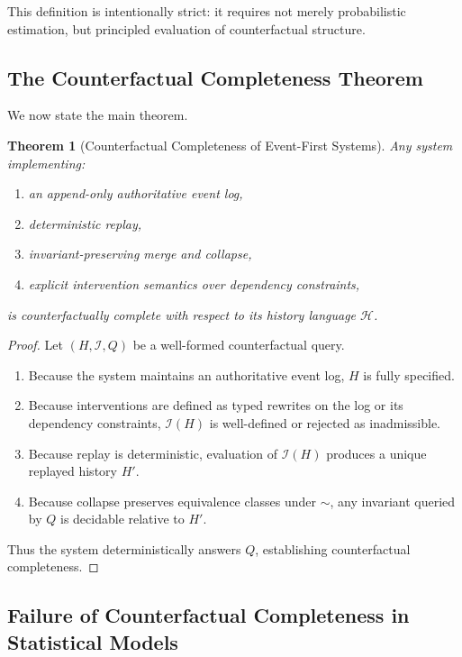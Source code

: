 \documentclass[11pt]{article}
\newtheorem{theorem}{Theorem}
\begin{document}
This definition is intentionally strict: it requires not merely probabilistic estimation, but principled evaluation of counterfactual structure.

\subsection{The Counterfactual Completeness Theorem}

We now state the main theorem.

\begin{theorem}[Counterfactual Completeness of Event-First Systems]
Any system implementing:
\begin{enumerate}
  \item an append-only authoritative event log,
  \item deterministic replay,
  \item invariant-preserving merge and collapse,
  \item explicit intervention semantics over dependency constraints,
\end{enumerate}
is counterfactually complete with respect to its history language $\mathcal{H}$.
\end{theorem}

\begin{proof}
Let $(H,\mathcal{I},Q)$ be a well-formed counterfactual query.
\begin{enumerate}
  \item Because the system maintains an authoritative event log, $H$ is fully specified.
  \item Because interventions are defined as typed rewrites on the log or its dependency constraints, $\mathcal{I}(H)$ is well-defined or rejected as inadmissible.
  \item Because replay is deterministic, evaluation of $\mathcal{I}(H)$ produces a unique replayed history $H'$.
  \item Because collapse preserves equivalence classes under $\sim$, any invariant queried by $Q$ is decidable relative to $H'$.
\end{enumerate}
Thus the system deterministically answers $Q$, establishing counterfactual completeness.
\end{proof}

\subsection{Failure of Counterfactual Completeness in Statistical Models}
\end{document}
